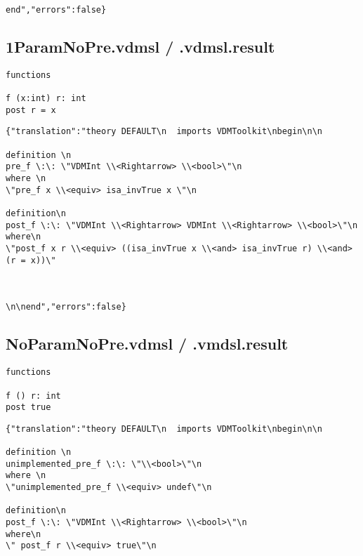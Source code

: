\begin{appendices}
\begin{lstlisting}
end","errors":false}
\end{lstlisting}

\subsection{1ParamNoPre.vdmsl / .vdmsl.result}
\begin{lstlisting}
functions

f (x:int) r: int
post r = x
\end{lstlisting}

\begin{lstlisting}
{"translation":"theory DEFAULT\n  imports VDMToolkit\nbegin\n\n

definition \n
pre_f \:\: \"VDMInt \\<Rightarrow> \\<bool>\"\n
where \n
\"pre_f x \\<equiv> isa_invTrue x \"\n

definition\n
post_f \:\: \"VDMInt \\<Rightarrow> VDMInt \\<Rightarrow> \\<bool>\"\n
where\n
\"post_f x r \\<equiv> ((isa_invTrue x \\<and> isa_invTrue r) \\<and> (r = x))\"



\n\nend","errors":false}
\end{lstlisting}

\subsection{NoParamNoPre.vdmsl / .vmdsl.result}
\begin{lstlisting}
functions

f () r: int
post true
\end{lstlisting}

\begin{lstlisting}
{"translation":"theory DEFAULT\n  imports VDMToolkit\nbegin\n\n

definition \n
unimplemented_pre_f \:\: \"\\<bool>\"\n
where \n
\"unimplemented_pre_f \\<equiv> undef\"\n

definition\n
post_f \:\: \"VDMInt \\<Rightarrow> \\<bool>\"\n
where\n
\" post_f r \\<equiv> true\"\n




\end{lstlisting}
\end{appendices}
